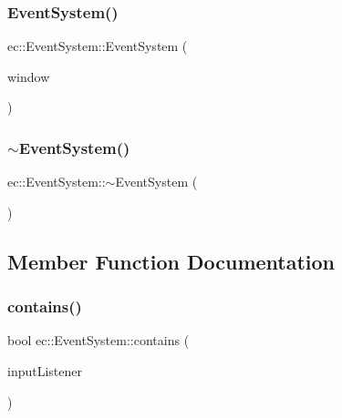 \subsubsection{\texorpdfstring{Event\+System()}{EventSystem()}}
{\footnotesize\ttfamily ec\+::\+Event\+System\+::\+Event\+System (\begin{DoxyParamCaption}\item[{\mbox{\hyperlink{classec_1_1_window}{Window}} $\ast$}]{window }\end{DoxyParamCaption})\hspace{0.3cm}{\ttfamily [explicit]}}

\mbox{\label{classec_1_1_event_system_ab67b98ebb182137fb1f380ee5289d1e8}} 
\subsubsection{\texorpdfstring{$\sim$\+Event\+System()}{~EventSystem()}}
{\footnotesize\ttfamily ec\+::\+Event\+System\+::$\sim$\+Event\+System (\begin{DoxyParamCaption}{ }\end{DoxyParamCaption})\hspace{0.3cm}{\ttfamily [default]}}



\subsection{Member Function Documentation}
\mbox{\label{classec_1_1_event_system_a0df83c331a79a7dfdaa9e48920d24c9f}} 
\subsubsection{\texorpdfstring{contains()}{contains()}}
{\footnotesize\ttfamily bool ec\+::\+Event\+System\+::contains (\begin{DoxyParamCaption}\item[{\mbox{\hyperlink{classec_1_1_input_listener}{Input\+Listener}} $\ast$}]{input\+Listener }\end{DoxyParamCaption})}

